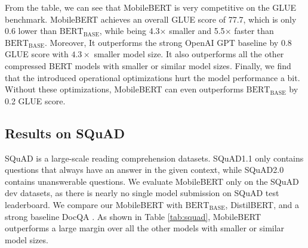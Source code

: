 \documentclass[11pt,a4paper]{article}
\begin{document}
\setlength{\tabcolsep}{2pt}
\begin{table}[t]
\begin{center}
	\end{center}
	\caption{Results of MobileBERT on GLUE dev accuracy and SQuAD v1.1 dev F1 score with 8-bit Quantization.}
	\label{tab:quantization}
\end{table}
\setlength{\tabcolsep}{6pt}


From the table, we can see that MobileBERT is very competitive on the GLUE benchmark. MobileBERT achieves an overall GLUE score of 77.7, which is only 0.6 lower than $\text{BERT}_\text{BASE}$, while being 4.3$\times$ smaller and 5.5$\times$ faster than $\text{BERT}_\text{BASE}$. Moreover, It outperforms the strong OpenAI GPT baseline by 0.8 GLUE score with $4.3\times$ smaller model size. It also outperforms all the other compressed BERT models with smaller or similar model sizes.
Finally, we find that the introduced operational optimizations hurt the model performance a bit. Without these optimizations, MobileBERT can even outperforms $\text{BERT}_\text{BASE}$ by 0.2 GLUE score.


\subsection{Results on SQuAD}

SQuAD is a large-scale reading comprehension datasets. SQuAD1.1 \citep{rajpurkar2016squad} only contains questions that always have an answer in the given context, while SQuAD2.0 \citep{rajpurkar2018know} contains unanswerable questions. 
We evaluate MobileBERT only on the SQuAD dev datasets, as there is nearly no single model submission on SQuAD test leaderboard. We compare our MobileBERT with $\text{BERT}_\text{BASE}$, DistilBERT, and a strong baseline DocQA \citep{clark2017simple}. As shown in Table \ref{tab:squad}, MobileBERT outperforms a large margin over all the other models with smaller or similar model sizes.
\end{document}
